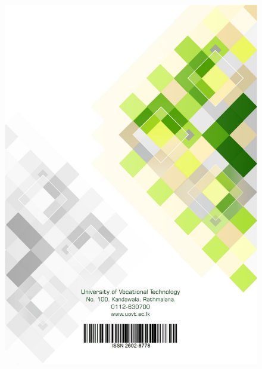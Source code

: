 \documentclass[b5paper,10pt]{article}
\begin{document}










\thispagestyle{empty} %
\begin{figure}[ht]
    \centering
    \includegraphics[width=\paperwidth, height=\paperheight, keepaspectratio]{Images/Back.jpeg}
\end{figure}
\end{document}
